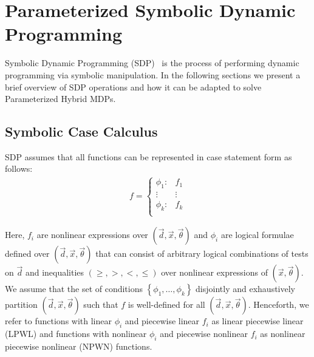 \section{Parameterized Symbolic Dynamic Programming}
\label{sec:sdp}

Symbolic Dynamic Programming (SDP)~\cite{Boutilier_IJCAI_2001} is the process of performing dynamic programming via symbolic manipulation. In the following sections we present a brief overview of SDP operations and how it can be adapted to solve Parameterized Hybrid MDPs.

\subsection{Symbolic Case Calculus}

SDP assumes that all functions can be represented in case statement form \cite{Boutilier_IJCAI_2001} as follows:
{\footnotesize 
    \abovedisplayskip=5pt
    \belowdisplayskip=0pt
    \begin{align*}
        f = 
        \begin{cases}
            \phi_1: & f_1 \\ 
            \vdots & \vdots\\ 
            \phi_k: & f_k \\ 
        \end{cases}
    \end{align*}
}%

Here, {\footnotesize$ f_i $} are nonlinear expressions over {\footnotesize$( \vec{d}, \vec{x}, \vec{\theta})$} and {\footnotesize$\phi_i$} are logical formulae defined over {\footnotesize$( \vec{d}, \vec{x}, \vec{\theta})$} that can consist of arbitrary logical combinations of tests on {\footnotesize$\vec{d}$} and inequalities {\footnotesize$\left( \geq, >, <, \leq \right)$} over nonlinear expressions of   {\footnotesize$(\vec{x}, \vec{\theta})$}. We assume that the set of conditions {\footnotesize$\left\lbrace \phi_1, \ldots, \phi_k \right\rbrace$} disjointly and exhaustively partition {\footnotesize$(\vec{d}, \vec{x}, \vec{\theta})$} such that {\footnotesize$f$} is well-defined for all {\footnotesize$(\vec{d}, \vec{x}, \vec{\theta})$}. Henceforth, we refer to functions with linear {\footnotesize$\phi_i$} and piecewise linear {\footnotesize$f_i$} as linear piecewise linear (LPWL) and functions with nonlinear {\footnotesize$\phi_i$} and piecewise nonlinear {\footnotesize$f_i$} as nonlinear piecewise nonlinear (NPWN) functions.

